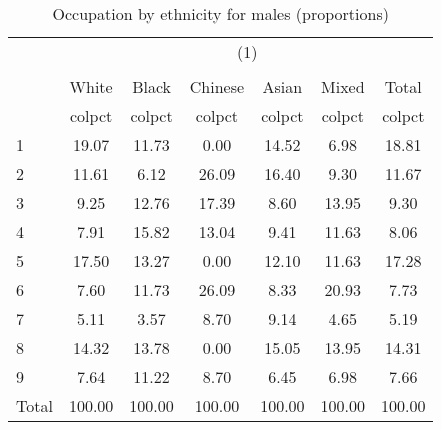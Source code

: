 \begin{table}[htbp]\centering
\def\sym#1{\ifmmode^{#1}\else\(^{#1}\)\fi}
\caption{Occupation by ethnicity for males (proportions)}
\begin{tabular}{l*{6}{c}}
\hline\hline
          &\multicolumn{6}{c}{(1)}                                    \\
          &\multicolumn{6}{c}{}                                       \\
          &    White&    Black&  Chinese&    Asian&    Mixed&    Total\\
          &   colpct&   colpct&   colpct&   colpct&   colpct&   colpct\\
\hline
1         &    19.07&    11.73&     0.00&    14.52&     6.98&    18.81\\
2         &    11.61&     6.12&    26.09&    16.40&     9.30&    11.67\\
3         &     9.25&    12.76&    17.39&     8.60&    13.95&     9.30\\
4         &     7.91&    15.82&    13.04&     9.41&    11.63&     8.06\\
5         &    17.50&    13.27&     0.00&    12.10&    11.63&    17.28\\
6         &     7.60&    11.73&    26.09&     8.33&    20.93&     7.73\\
7         &     5.11&     3.57&     8.70&     9.14&     4.65&     5.19\\
8         &    14.32&    13.78&     0.00&    15.05&    13.95&    14.31\\
9         &     7.64&    11.22&     8.70&     6.45&     6.98&     7.66\\
Total     &   100.00&   100.00&   100.00&   100.00&   100.00&   100.00\\
\hline\hline
\end{tabular}
\end{table}
